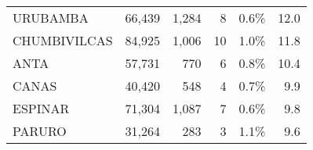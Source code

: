 \begin{tabular}{lrrrrr}
	\cellcolor[HTML]{FFFC9E}URUBAMBA      & 66,439                                                         & 1,284                                                                           & 8                                                              & 0.6\%                                                                  & 12.0                                                                                                                               \\
	\cellcolor[HTML]{FFFC9E}CHUMBIVILCAS  & 84,925                                                         & 1,006                                                                           & 10                                                             & 1.0\%                                                                  & 11.8                                                                                                                               \\
	\cellcolor[HTML]{FFFC9E}ANTA          & 57,731                                                         & 770                                                                             & 6                                                              & 0.8\%                                                                  & 10.4                                                                                                                               \\
	\cellcolor[HTML]{FFFC9E}CANAS         & 40,420                                                         & 548                                                                             & 4                                                              & 0.7\%                                                                  & 9.9                                                                                                                                \\
	\cellcolor[HTML]{FFFC9E}ESPINAR       & 71,304                                                         & 1,087                                                                           & 7                                                              & 0.6\%                                                                  & 9.8                                                                                                                                \\
	\cellcolor[HTML]{FFFC9E}PARURO        & 31,264                                                         & 283                                                                             & 3                                                              & 1.1\%                                                                  & 9.6                                                                                                                                \\

\end{tabular}
